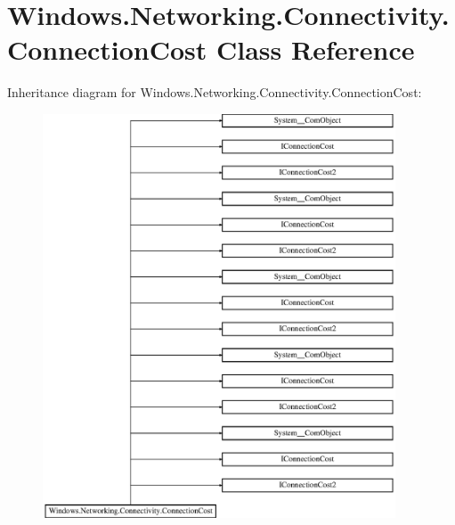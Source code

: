 \hypertarget{class_windows_1_1_networking_1_1_connectivity_1_1_connection_cost}{}\section{Windows.\+Networking.\+Connectivity.\+Connection\+Cost Class Reference}
\label{class_windows_1_1_networking_1_1_connectivity_1_1_connection_cost}
Inheritance diagram for Windows.\+Networking.\+Connectivity.\+Connection\+Cost\+:\begin{figure}[H]
\begin{center}
\leavevmode
\includegraphics[height=12.000000cm]{class_windows_1_1_networking_1_1_connectivity_1_1_connection_cost}
\end{center}
\end{figure}
